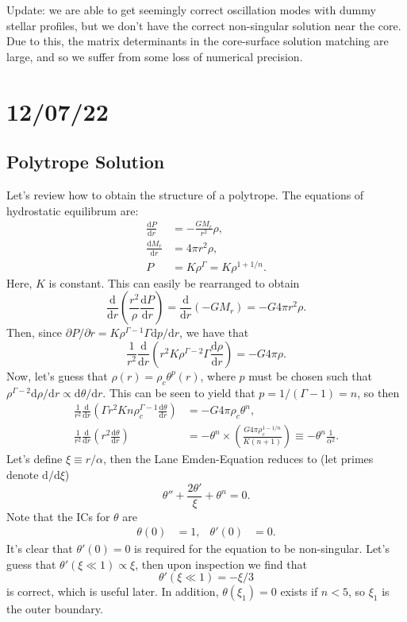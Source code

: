 \documentclass[11pt,
        usenames, %
        twocolumn,
        landscape,
        dvipsnames %
    ]{article}
\newcommand*{\rd}[2]{\frac{\mathrm{d}#1}{\mathrm{d}#2}}
\newcommand*{\rdil}[2]{\mathrm{d}#1 / \mathrm{d}#2}
\newcommand*{\pdil}[2]{\partial#1 / \partial#2}
\newcommand*{\p}[1]{\left(#1\right)}
\begin{document}
Update: we are able to get seemingly correct oscillation modes with dummy
stellar profiles, but we don't have the correct non-singular solution near the
core. Due to this, the matrix determinants in the core-surface solution matching
are large, and so we suffer from some loss of numerical precision.

\section{12/07/22}

\subsection{Polytrope Solution}

Let's review how to obtain the structure of a polytrope. The equations of
hydrostatic equilibrum are:
\begin{align}
    \rd{P}{r} &= -\frac{GM_r}{r^2}\rho,\\
    \rd{M_r}{r} &= 4\pi r^2\rho,\\
    P &= K\rho^\Gamma = K\rho^{1 + 1/n}.
\end{align}
Here, $K$ is constant. This can easily be rearranged to obtain
\begin{equation}
    \rd{}{r}\p{\frac{r^2}{\rho}\rd{P}{r}} = \rd{}{r}\p{-GM_r} = -G4\pi r^2\rho.
\end{equation}
Then, since $\pdil{P}{r} = K\rho^{\Gamma - 1}\Gamma \rdil{p}{r}$, we have that
\begin{equation}
    \frac{1}{r^2}\rd{}{r}\p{r^2 K\rho^{\Gamma - 2}\Gamma \rd{\rho}{r}}
        = -G 4\pi \rho.
\end{equation}
Now, let's guess that $\rho(r) = \rho_c \theta^p(r)$, where $p$ must be
chosen such that $\rho^{\Gamma - 2}\rdil{\rho}{r} \propto \rdil{\theta}{r}$.
This can be seen to yield that $p = 1 / (\Gamma - 1) = n$, so then
\begin{align}
    \frac{1}{r^2}\rd{}{r}\p{\Gamma r^2Kn\rho_c^{\Gamma - 1}\rd{\theta}{r}}
        &= -G 4\pi \rho_c \theta^n,\\
    \frac{1}{r^2}\rd{}{r}\p{r^2\rd{\theta}{r}}
        &= -\theta^n \times \p{\frac{G4\pi \rho_c^{1 - 1/n}}{K\p{n + 1}}}
        \equiv -\theta^n \frac{1}{\alpha^2}.
\end{align}
Let's define $\xi \equiv r/\alpha$, then the Lane Emden-Equation reduces to (let
primes denote $\rdil{}{\xi}$)
\begin{equation}
    \theta'' + \frac{2\theta'}{\xi} +\theta^n = 0.
\end{equation}
Note that the ICs for $\theta$ are
\begin{align}
    \theta(0) &= 1, & \theta'(0) &= 0.
\end{align}
It's clear that $\theta'(0) = 0$ is required for the equation to be non-singular.
Let's guess that $\theta'(\xi \ll 1) \propto \xi$, then upon inspection we find
that
\begin{equation}
    \theta'(\xi \ll 1) = -\xi / 3
\end{equation}
is correct, which is useful later. In addition, $\theta(\xi_1) = 0$ exists if $n
< 5$, so $\xi_1$ is the outer boundary.
\end{document}
